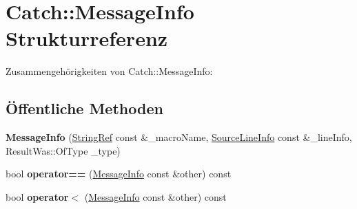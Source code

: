 \hypertarget{structCatch_1_1MessageInfo}{}\section{Catch\+:\+:Message\+Info Strukturreferenz}
\label{structCatch_1_1MessageInfo}


Zusammengehörigkeiten von Catch\+:\+:Message\+Info\+:
\subsection*{Öffentliche Methoden}
\begin{DoxyCompactItemize}
\item 
\mbox{\label{structCatch_1_1MessageInfo_afac7a84a9e8655428035a3c5418044f0}} 
{\bfseries Message\+Info} (\hyperlink{classCatch_1_1StringRef}{String\+Ref} const \&\+\_\+macro\+Name, \hyperlink{structCatch_1_1SourceLineInfo}{Source\+Line\+Info} const \&\+\_\+line\+Info, Result\+Was\+::\+Of\+Type \+\_\+type)
\item 
\mbox{\label{structCatch_1_1MessageInfo_af4b37f2172ba55395813b4bb6bbbde1a}} 
bool {\bfseries operator==} (\hyperlink{structCatch_1_1MessageInfo}{Message\+Info} const \&other) const
\item 
\mbox{\label{structCatch_1_1MessageInfo_a8254cb8fca2da02a29a9843cdcb79df1}} 
bool {\bfseries operator$<$} (\hyperlink{structCatch_1_1MessageInfo}{Message\+Info} const \&other) const
\end{DoxyCompactItemize}
